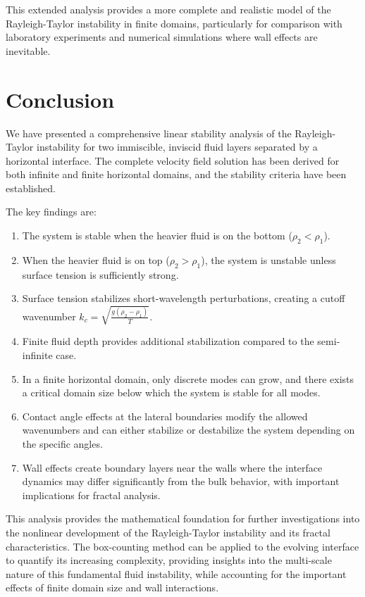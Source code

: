 \documentclass[12pt,a4paper]{article}
\begin{document}
This extended analysis provides a more complete and realistic model of the Rayleigh-Taylor instability in finite domains, particularly for comparison with laboratory experiments and numerical simulations where wall effects are inevitable.

\section{Conclusion}
We have presented a comprehensive linear stability analysis of the Rayleigh-Taylor instability for two immiscible, inviscid fluid layers separated by a horizontal interface. The complete velocity field solution has been derived for both infinite and finite horizontal domains, and the stability criteria have been established.

The key findings are:
\begin{enumerate}
    \item The system is stable when the heavier fluid is on the bottom ($\rho_2 < \rho_1$).
    \item When the heavier fluid is on top ($\rho_2 > \rho_1$), the system is unstable unless surface tension is sufficiently strong.
    \item Surface tension stabilizes short-wavelength perturbations, creating a cutoff wavenumber $k_c = \sqrt{\frac{g(\rho_2 - \rho_1)}{T}}$.
    \item Finite fluid depth provides additional stabilization compared to the semi-infinite case.
    \item In a finite horizontal domain, only discrete modes can grow, and there exists a critical domain size below which the system is stable for all modes.
    \item Contact angle effects at the lateral boundaries modify the allowed wavenumbers and can either stabilize or destabilize the system depending on the specific angles.
    \item Wall effects create boundary layers near the walls where the interface dynamics may differ significantly from the bulk behavior, with important implications for fractal analysis.
\end{enumerate}

This analysis provides the mathematical foundation for further investigations into the nonlinear development of the Rayleigh-Taylor instability and its fractal characteristics. The box-counting method can be applied to the evolving interface to quantify its increasing complexity, providing insights into the multi-scale nature of this fundamental fluid instability, while accounting for the important effects of finite domain size and wall interactions.
\end{document}
